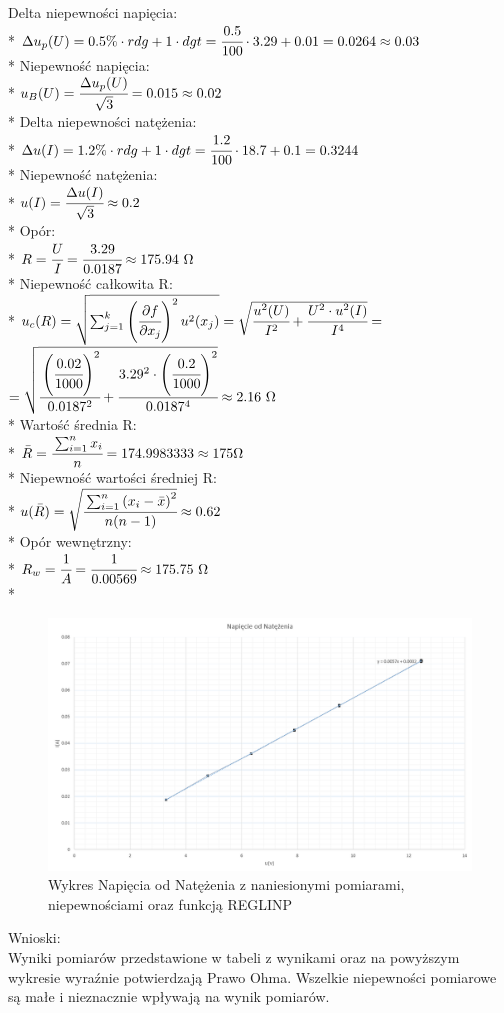 \documentclass{article}
\begin{document}
\begin{center}
    Delta niepewności napięcia:\\*
    $\Delta u_p (U)  = 0.5\% \cdot rdg+1 \cdot dgt=\cfrac{0.5}{100} \cdot 3.29 + 0.01=0.0264\approx0.03$\\*
    Niepewność napięcia:\\*
    $u_B (U)=\cfrac{\Delta u_p(U)}{\sqrt{3}}=0.015\approx0.02$\\*
    Delta niepewności natężenia:\\* 
    $\Delta u(I) = 1.2\% \cdot rdg+1 \cdot dgt = \cfrac{1.2}{100} \cdot 18.7 +0.1 =0.3244$\\*
    Niepewność natężenia:\\*
    $u(I)= \cfrac{\Delta u(I)}{\sqrt{3}} \approx 0.2$\\*
    Opór:\\* 
    $R=\cfrac{U}{I} = \cfrac{3.29}{0.0187} \approx 175.94 \ \Omega$\\*
    Niepewność całkowita R:\\*
    $u_c (R)=\sqrt{\sum_{j=1}^{k}\left( \cfrac{\partial f}{\partial x_j}\right)^2 u^2 (x_j)}
    =\sqrt{\cfrac{u^2 (U)}{I^2} + \cfrac{U^2 \cdot u^2 (I)}{I^4}}=$
    $= \sqrt{\cfrac{\left(\cfrac{0.02}{1000}\right)^2}{0.0187^2} + \cfrac{3.29^2 \cdot \left(\cfrac{0.2}{1000}\right)^2}{0.0187^4}}\approx 2.16 \ \Omega$\\* 
    Wartość średnia R:\\* 
    $\bar{R} = \cfrac{\sum_{i=1}^{n}x_i}{n}=174.9983333 \approx 175\Omega$\\*
    Niepewność wartości średniej R:\\*
    $u(\bar{R}) = \sqrt{\cfrac{\sum_{i=1}^{n} \left(x_i - \bar{x} \right)^2}{n(n-1)}}\approx 0.62$\\*
    Opór wewnętrzny:\\* 
    $R_w =\cfrac{1}{A}=\cfrac{1}{0.00569} \approx 175.75 \ \Omega$\\*

\end{center}
\newpage
\begin{figure}[h]
    \centering
    \includegraphics[width=\textwidth]{graph2.png}
    \caption{Wykres Napięcia od Natężenia z naniesionymi pomiarami, niepewnościami
     oraz funkcją REGLINP}
    \label{fig:mesh1}
\end{figure}
Wnioski:\\
Wyniki pomiarów przedstawione w tabeli z wynikami oraz na powyższym wykresie 
wyraźnie potwierdzają Prawo Ohma. Wszelkie niepewności pomiarowe są małe i 
nieznacznie wpływają na wynik pomiarów. 
\end{document}
